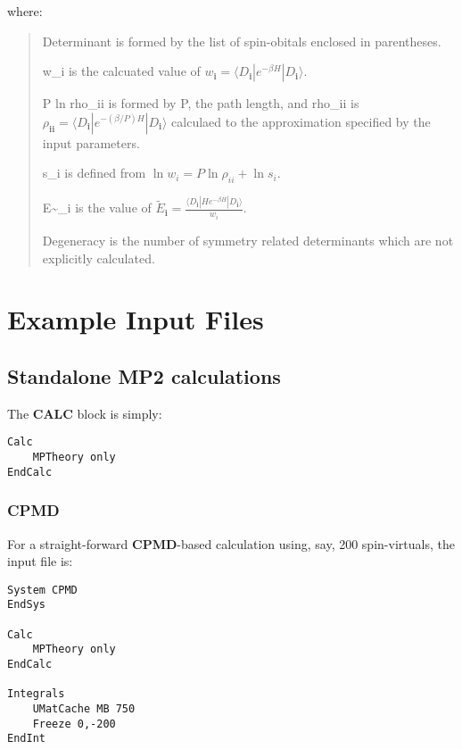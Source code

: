 \documentclass[openany,a4paper,10pt]{manual}
\newcommand{\bra}{\ensuremath{\langle}}
\newcommand{\ket}{\ensuremath{\rangle}}
\newcommand{\veci}{\ensuremath{\mathbf{i}}}
\begin{document}
where:
\begin{quote}

Determinant is formed by the list of spin-obitals enclosed in parentheses.

w\_i is the calcuated value of $w_{\veci}=\bra D_{\veci} | e^{-\beta H} | D_{\veci} \ket$.

P ln rho\_ii is formed by P, the path length, and rho\_ii is
$\rho_{\veci\veci}=\bra D_{\veci} | e^{-(\beta/P) H} | D_{\veci} \ket$
calculaed to the approximation specified by the input parameters.

s\_i is defined from $\operatorname{ln} w_i = P \operatorname{ln} \rho_{ii} + \operatorname{ln} s_i$.

E\textasciitilde{}\_i is the value of $\tilde{E}_{\veci}=\frac{\bra D_{\veci} | H e^{-\beta H} | D_{\veci} \ket}{w_i}$.

Degeneracy is the number of symmetry related determinants which are not explicitly calculated.
\end{quote}

\resetcurrentobjects


\hypertarget{example-inputs-index}{}\chapter{Example Input Files}

\resetcurrentobjects


\hypertarget{input-examples}{}\section{Standalone MP2 calculations}

The \textbf{CALC} block is simply:

\begin{Verbatim}[commandchars=@\[\]]
Calc
    MPTheory only
EndCalc
\end{Verbatim}


\subsection{CPMD}

For a straight-forward \textbf{CPMD}-based calculation using, say, 200 spin-virtuals, the input file is:

\begin{Verbatim}[commandchars=@\[\]]
System CPMD
EndSys

Calc
    MPTheory only
EndCalc

Integrals
    UMatCache MB 750
    Freeze 0,-200
EndInt
\end{Verbatim}
\end{document}
